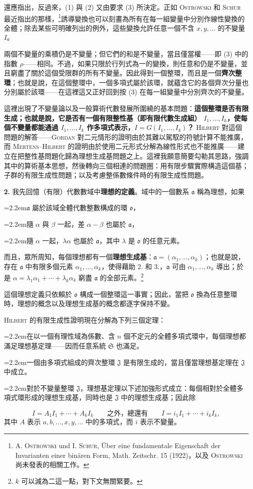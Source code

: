 \documentclass[11pt]{article}
\newcommand{\ma}{\mathfrak a}
\newcommand{\mo}{\mathfrak o}
\newcommand{\mS}{\mathfrak S}
\newcommand{\mJ}{\mathfrak J}
\newcommand{\srcemph}[1]{\textbf{#1}}
\newcommand{\srcname}[1]{\textsc{#1}}
\newcommand{\PXXIIIitem}[2]{\par\noindent\hangindent=2.2em\hangafter=1\makebox[2.2em][l]{#1.}#2\par}
\begin{document}
還應指出，反過來，(1) 與 (2) 又由要求 (3) 所決定。正如 \srcname{Ostrowski} 和 \srcname{Schur} 最近指出的那樣，\footnote{A. \textsc{Ostrowski} und I. \textsc{Schur}, Über eine fundamentale Eigenschaft der Invarianten einer binären Form, Math. Zeitschr. 15 (1922)，以及 \textsc{Ostrowski} 尚未發表的相關工作。}誘導變換也可以刻畫為所有在每一組變量中分別作線性變換的全體；除去某些可明確列出的例外，這些變換允許任意一個不含 $x,y,\ldots$ 的不變量 $I$。

兩個不變量的乘積仍是不變量；但它們的和是不變量，當且僅當權——即 (3) 中的指數 $\rho$——相同。不過，如果只限於行列式為一的變換，則任意和仍是不變量，並且窮盡了關於這個受限群的所有不變量。因此得到一個整環，而且是一個\srcemph{齊次整環}；也就是說，在這個整環中，一個多項式屬於該環，就蘊含它的各個齊次分量也分別屬於該環——在這裡這又正好回到按 (3) 在每一組變量中分別齊次的不變量。

這裡出現了不變量論以及一般算術代數發展所圍繞的基本問題：\srcemph{這個整環是否有限生成；也就是說，它是否有一個有限整性基（即有限代數生成組） $I_1,\ldots,I_k$，使每個不變量都能通過 $I_1,\ldots,I_k$ 作多項式表示，$I=G(I_1,\ldots,I_k)$？} \srcname{Hilbert} 對這個問題的解答——\srcname{Gordan} 對二元情形的證明由於其難以駕馭的符號計算不能推廣，而 \srcname{Mertens--Hilbert} 的證明由於使用二元形式分解為線性形式也不能推廣——建立在把整性基問題化歸為理想生成基問題之上。這裡我願意簡要勾勒其思路，強調其中的算術基本思想，然後轉向三個相連的問題圈：用有限步驟實際構造這個基；子群的有限生成性問題；以及考慮整係數條件時的有限生成性問題。

\textbf{2.} 我先回憶（有限）代數數域中\srcemph{理想的定義}。域中的一個數系 $\ma$ 稱為理想，如果
\PXXIIIitem{1}{$\ma$ 屬於該域全體代數整數構成的環 $\mo$，}
\PXXIIIitem{2}{隨 $\alpha$ 與 $\beta$ 一起，差 $\alpha-\beta$ 也屬於 $\ma$，}
\PXXIIIitem{3}{隨 $\alpha$ 一起，$\lambda\alpha$ 也屬於 $\ma$，其中 $\lambda$ 是 $\mo$ 的任意元素。}
而且，眾所周知，每個理想都有一個\srcemph{理想生成基}：$\ma=(\alpha_1,\ldots,\alpha_k)$；也就是說，存在 $\ma$ 中有限多個元素 $\alpha_1,\ldots,\alpha_k$，使得藉助 2. 和 3.，$\ma$ 可由 $\alpha_1,\ldots,\alpha_k$ 導出；於是 $\alpha=\lambda_1\alpha_1+\cdots+\lambda_k\alpha_k$ 窮盡 $\ma$ 的全部元素。\footnote{$k$ 可以減為二這一點，對下文無關緊要。}

這個理想定義只依賴於 $\mo$ 構成一個整環這一事實；因此，當把 $\mo$ 換為任意整環時，理想的概念以及理想生成基的概念都逐字保持不變。

\srcname{Hilbert} 的有限生成性證明現在分解為下列三個定理：
\PXXIIIitem{1}{在以一個有理性域為係數、含 $n$ 個不定元的全體多項式環中，每個理想都滿足理想基定理——因而任意系統 $\mS$ 也滿足。}
\PXXIIIitem{2}{一個由多項式組成的齊次整環 $\mJ$ 是有限生成的，當且僅當理想基定理在 $\mJ$ 中成立。}
\PXXIIIitem{3}{對於不變量整環 $\mJ$，理想基定理以下述加強形式成立：每個相對於全體多項式環形成的理想生成基，同時也是 $\mJ$ 中的理想生成基；因此除}
\[
 I=A_1I_1+\cdots+A_kI_k
 \qquad\text{之外，總還有}\qquad
 I=i_1I_1+\cdots+i_kI_k,
\]
其中 $A$ 表示 $a,b,\ldots,x,y,\ldots$ 中的多項式，而 $i$ 表示不變量。
\end{document}
